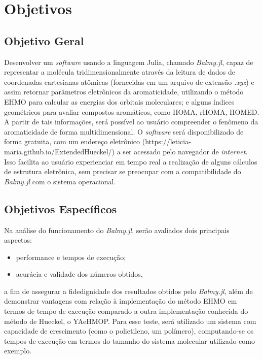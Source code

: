 \chapter{Objetivos}

\section{Objetivo Geral}

 Desenvolver um \textit{software} usando a linguagem Julia, chamado \textit{Balmy.jl}, capaz de representar a molécula tridimensionalmente através da leitura de dados de coordenadas cartesianas atômicas (fornecidas em um arquivo de extensão \textit{.xyz}) e assim retornar parâmetros eletrônicos da aromaticidade, utilizando o método \gls{EHMO} para calcular as energias dos orbitais moleculares; e alguns índices geométricos para avaliar compostos aromáticos, como \gls{HOMA}, \gls{rHOMA}, \gls{HOMED}. A partir de tais informações, será possível ao usuário compreender o fenômeno da aromaticidade de forma multidimensional. O \textit{software} será disponibilizado de forma gratuita, com um endereço eletrônico (https://leticia-maria.github.io/ExtendedHueckel/) a ser acessado pelo navegador de \textit{internet}. Isso facilita ao usuário experienciar em tempo real a realização de alguns cálculos de estrutura eletrônica, sem precisar se preocupar com a compatibilidade do \textit{Balmy.jl} com o sistema operacional.

\section{Objetivos Específicos}

Na análise do funcionamento do \textit{Balmy.jl}, serão avaliados dois principais aspectos:

\begin{itemize}
    \item performance e tempos de execução;
    \item acurácia e validade dos números obtidos,
\end{itemize}

\noindent a fim de assegurar a fidedignidade dos resultados obtidos pelo \textit{Balmy.jl}, além de demonstrar vantagens com relação à implementação do método \gls{EHMO} em termos de tempo de execução comparado a outra implementação conhecida do método de Hueckel, o \gls{YAeHMOP}. Para esse teste, será utilizado um sistema com capacidade de crescimento (como o polietileno, um polímero), computando-se os tempos de execução em termos do tamanho do sistema molecular utilizado como exemplo.

